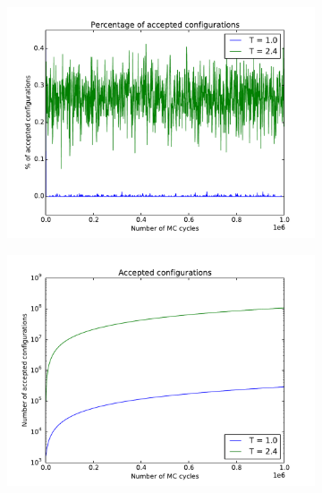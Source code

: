 	\begin{figure}[H]
	\begin{subfigure}[b]{0.49\textwidth}
	\includegraphics[width=1\linewidth]{../results/4c/L_20_accepted_configs}
\caption{}
\label{fig:l20acceptedconfigs}
	\end{subfigure}
	\hfill
	\begin{subfigure}[b]{0.49\textwidth}
	\includegraphics[width=1\linewidth]{../results/4c/L_20_accepted_configs_}
\caption{}
\label{fig:l20acceptedconfigs}
	\end{subfigure}
	\caption{}
\end{figure}











